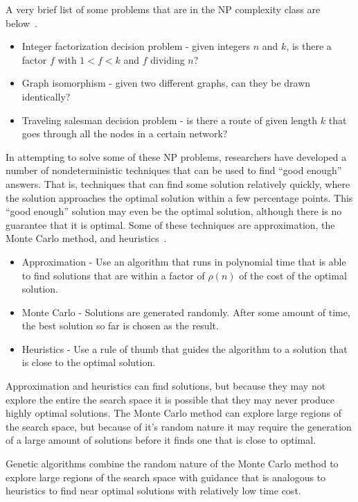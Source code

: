 A very brief list of some problems that are in the NP complexity class are
below~\cite{garey1979computers}.

\begin{itemize}
\item{Integer factorization decision problem - given integers \(n\) and \(k\),
is there a factor \(f\) with \(1 < f < k\) and \(f\) dividing \(n\)?}
\item{Graph isomorphism - given two different graphs, can they be drawn
identically?}
\item{Traveling salesman decision problem - is there a route of given length
\(k\) that goes through all the nodes in a certain network?}
\end{itemize}

In attempting to solve some of these NP problems, researchers have developed a
number of nondeterministic techniques that can be used to find ``good enough''
answers. That is, techniques that can find some solution relatively quickly,
where the solution approaches the optimal solution within a few percentage
points. This ``good enough'' solution may even be the optimal solution, although
there is no guarantee that it is optimal. Some of these techniques are
approximation, the Monte Carlo method, and
heuristics~\cite{Cormen:2009:IAT:1614191}.

\begin{itemize}
  \item {Approximation - Use an algorithm that runs in polynomial time that is
  able to find solutions that are within a factor of \(\rho (n)\) of the cost of
  the optimal solution.}
  \item {Monte Carlo - Solutions are generated randomly. After some amount of
  time, the best solution so far is chosen as the result.}
  \item {Heuristics - Use a rule of thumb that guides the algorithm to a
  solution that is close to the optimal solution.}
\end{itemize}

Approximation and heuristics can find solutions, but because they may not
explore the entire the search space it is possible that they may never produce
highly optimal solutions. The Monte Carlo method can explore large regions of
the search space, but because of it's random nature it may require the
generation of a large amount of solutions before it finds one that is close to
optimal.

Genetic algorithms combine the random nature of the Monte Carlo method to
explore large regions of the search space with guidance that is analogous to
heuristics to find near optimal solutions with relatively low time cost.

